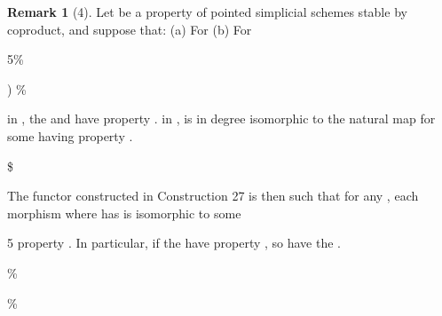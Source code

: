 \documentclass[11pt,a4paper]{article}
\theoremstyle{plain}
\theoremstyle{definition}
\newtheorem{remark}[theorem]{Remark}
\begin{document}
\begin{remark}[4]
Let be a property of pointed simplicial schemes stable by coproduct,
and suppose that:
(a) For
(b) For





5\%


) 
\%



in , the  and  have property .
in , is in degree isomorphic to the natural map
for some having property .





\$



The functor
constructed in Construction 27 is then such that for any , each
morphism 
where has
 is isomorphic to some

 5
property . In particular, if the  have property , so have the
.

 





\%
 

\%

\end{remark}
\end{document}
